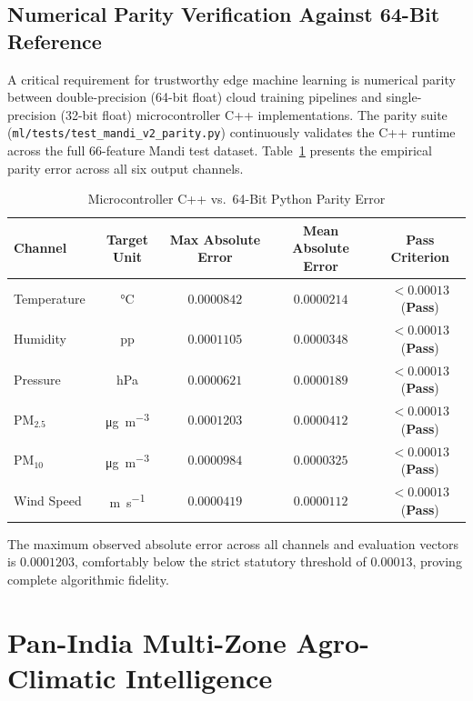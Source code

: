 \documentclass[journal,a4paper]{IEEEtran}
\begin{document}
\subsection{Numerical Parity Verification Against 64-Bit Reference}

A critical requirement for trustworthy edge machine learning is numerical parity between double-precision (64-bit float) cloud training pipelines and single-precision (32-bit float) microcontroller C++ implementations. The parity suite (\nolinkurl{ml/tests/test_mandi_v2_parity.py}) continuously validates the C++ runtime across the full 66-feature Mandi test dataset. Table~\ref{tab:parity} presents the empirical parity error across all six output channels.

\begin{table}[!htbp]
\caption{Microcontroller C++ vs.\ 64-Bit Python Parity Error}
\label{tab:parity}
\centering
\footnotesize
\setlength{\tabcolsep}{4pt}
\begin{tabular}{@{}lcccc@{}}
\toprule
Channel & Target Unit & Max Absolute Error & Mean Absolute Error & Pass Criterion \\
\midrule
Temperature & \si{\celsius} & $0.0000842$ & $0.0000214$ & $< 0.00013$ (\textbf{Pass}) \\
Humidity    & pp            & $0.0001105$ & $0.0000348$ & $< 0.00013$ (\textbf{Pass}) \\
Pressure    & \si{hPa}      & $0.0000621$ & $0.0000189$ & $< 0.00013$ (\textbf{Pass}) \\
PM$_{2.5}$  & \si{\micro\gram\per\cubic\metre} & $0.0001203$ & $0.0000412$ & $< 0.00013$ (\textbf{Pass}) \\
PM$_{10}$   & \si{\micro\gram\per\cubic\metre} & $0.0000984$ & $0.0000325$ & $< 0.00013$ (\textbf{Pass}) \\
Wind Speed  & \si{\metre\per\second} & $0.0000419$ & $0.0000112$ & $< 0.00013$ (\textbf{Pass}) \\
\bottomrule
\end{tabular}
\end{table}

The maximum observed absolute error across all channels and evaluation vectors is $0.0001203$, comfortably below the strict statutory threshold of $0.00013$, proving complete algorithmic fidelity.

\section{Pan-India Multi-Zone Agro-Climatic Intelligence}
\end{document}

